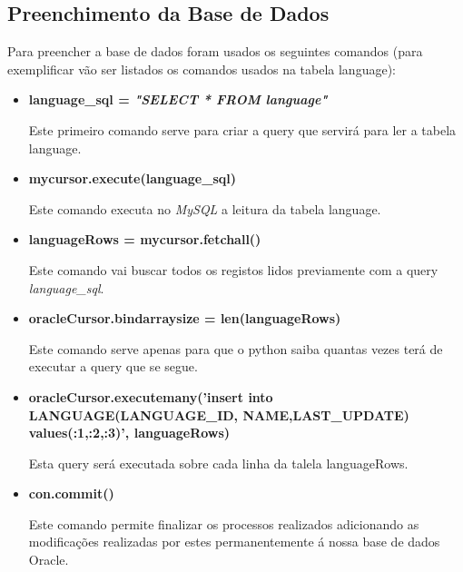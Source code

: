 \subsection{Preenchimento da Base de Dados}

\par Para preencher a base de dados foram usados os seguintes comandos (para exemplificar vão ser listados os comandos usados na tabela language):\newline
\begin{itemize}
\item \textbf{language\_sql = \textit{"SELECT * FROM language"}}


\par Este primeiro comando serve para criar a query que servirá para ler a tabela language. \newline

\item \textbf{mycursor.execute(language\_sql)}


\par Este comando executa no \textit{MySQL} a leitura da tabela language.\newline

\item \textbf{languageRows = mycursor.fetchall()}


\par Este comando vai buscar todos os registos lidos previamente com a query \textit{language\_sql}.\newline

\item \textbf{oracleCursor.bindarraysize = len(languageRows)}


\par Este comando serve apenas para que o python saiba quantas vezes terá de executar a query que se segue.\newline



\item \textbf{oracleCursor.executemany('insert into LANGUAGE(LANGUAGE\_ID, NAME,LAST\_UPDATE) values(:1,:2,:3)', languageRows)}


\par Esta query será executada sobre cada linha da talela languageRows.\newline

\item \textbf{con.commit()}


\par Este comando permite finalizar os processos realizados adicionando as modificações realizadas por estes permanentemente á nossa base de dados Oracle.


\end{itemize}

